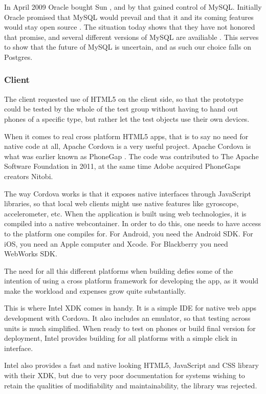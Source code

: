 \documentclass[11pt]{book}
\begin{document}
In April 2009 Oracle bought Sun \cite{sun}, and by that gained control of MySQL. Initially Oracle promised that MySQL would prevail and that it and its coming features would stay open source \cite{mysql}. The situation today shows that they have not honored that promise, and several different versions of MySQL are availiable \cite{mysqlproducts}. This serves to show that the future of MySQL is uncertain, and as such our choice falls on Postgres.

\subsubsection{Client}
The client requested use of HTML5 on the client side, so that the prototype could be tested by the whole of the test group without having to hand out phones of a specific type, but rather let the test objects use their own devices.

When it comes to real cross platform HTML5 apps, that is to say no need for native code at all, Apache Cordova is a very useful project. Apache Cordova is what was earlier known as PhoneGap \cite{phonegap}. The code was contributed to The Apache Software Foundation in 2011, at the same time Adobe acquired PhoneGaps creators Nitobi.

The way Cordova works is that it exposes native interfaces through JavaScript libraries, so that local web clients might use native features like gyroscope, accelerometer, etc. When the application is built using web technologies, it is compiled into a native webcontainer. In order to do this, one needs to have access to the platform one compiles for. For Android, you need the Android SDK. For iOS, you need an Apple computer and Xcode. For Blackberry you need WebWorks SDK.

The need for all this different platforms when building defies some of the intention of using a cross platform framework for developing the app, as it would make the workload and expenses grow quite substantially.

This is where Intel XDK comes in handy. It is a simple IDE for native web apps development with Cordova. It also includes an emulator, so that testing across units is much simplified. When ready to test on phones or build final version for deployment, Intel provides building for all platforms with a simple click in interface.

Intel also provides a fast and native looking HTML5, JavaScript and CSS library with their XDK, but due to very poor documentation for systems wishing to retain the qualities of modifiability and maintainability, the library was rejected.
\end{document}

